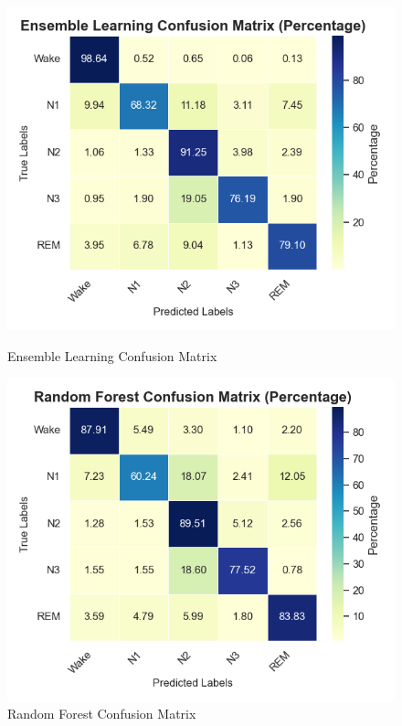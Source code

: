 \begin{figure}[H]
	\centering
	\begin{minipage}[b]{0.45\textwidth}
		\centering
		\includegraphics[width=\textwidth]{img/paper_1/Ensemble Learning_percentage_based.png}
		\caption{Ensemble Learning Confusion Matrix }
	\end{minipage}
	\hfill
	\begin{minipage}[b]{0.45\textwidth}
		\centering
		\includegraphics[width=\textwidth]{img/paper_1/Random Forest_percentage_based.png}
		\caption{Random Forest Confusion Matrix }
	\end{minipage}
	

\end{figure}
